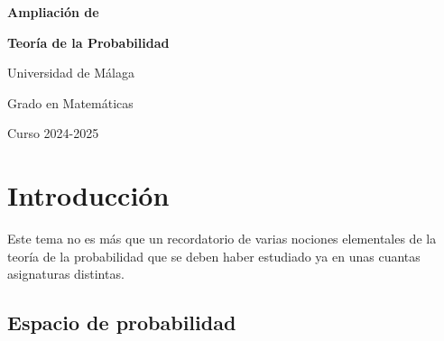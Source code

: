 \documentclass[a4paper, 11pt, extrafontsizes]{memoir}
\begin{document}
\begin{titlingpage*}

    \vspace*{0.5cm}
  
    
    \centering
    
    \vspace{\baselineskip}

    {\fontsize{27.5pt}{0pt}\selectfont\textbf{\color{white}Ampliación de}}

    \vspace{\baselineskip}

    {\fontsize{27.5pt}{0pt}\selectfont\textbf{\color{white}Teoría de la Probabilidad}}

    \vspace{5\baselineskip}
    
    {\color{black}\itshape\bfseries{
    
    Universidad de Málaga

    \vspace{0.5\baselineskip}
    
    Grado en Matemáticas
    
    \vspace{0.5\baselineskip}

    Curso 2024-2025
    
    }}
    
\end{titlingpage*}
  
\tableofcontents*
\thispagestyle{empty}  

\chapter{Introducción}

Este tema no es más que un recordatorio de varias nociones elementales de la teoría de la probabilidad que se deben haber estudiado ya en unas cuantas asignaturas distintas.

\section{Espacio de probabilidad}
\end{document}
